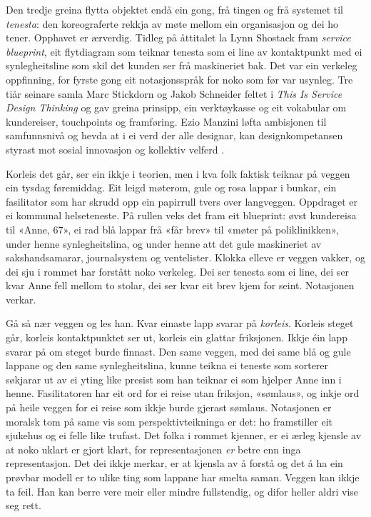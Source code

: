 Den tredje greina flytta objektet endå ein gong, frå tingen og frå systemet til \emph{tenesta}: den koreograferte rekkja av møte mellom ein organisasjon og dei ho tener. Opphavet er ærverdig. Tidleg på åttitalet la Lynn Shostack fram \emph{service blueprint}, eit flytdiagram som teiknar tenesta som ei line av kontaktpunkt med ei synlegheitsline som skil det kunden ser frå maskineriet bak. Det var ein verkeleg oppfinning, for fyrste gong eit notasjonsspråk for noko som før var usynleg. Tre tiår seinare samla Marc Stickdorn og Jakob Schneider feltet i \emph{This Is Service Design Thinking} og gav greina prinsipp, ein verktøykasse og eit vokabular om kundereiser, touchpoints og framføring. Ezio Manzini løfta ambisjonen til samfunnsnivå og hevda at i ei verd der alle designar, kan designkompetansen styrast mot sosial innovasjon og kollektiv velferd \autocite{manzini2015}.

Korleis det går, ser ein ikkje i teorien, men i kva folk faktisk teiknar på veggen ein tysdag føremiddag. Eit leigd møterom, gule og rosa lappar i bunkar, ein fasilitator som har skrudd opp ein papirrull tvers over langveggen. Oppdraget er ei kommunal helseteneste. På rullen veks det fram eit blueprint: øvst kundereisa til «Anne, 67», ei rad blå lappar frå «får brev» til «møter på poliklinikken», under henne synlegheitslina, og under henne att det gule maskineriet av sakshandsamarar, journalsystem og ventelister. Klokka elleve er veggen vakker, og dei sju i rommet har forstått noko verkeleg. Dei ser tenesta som ei line, dei ser kvar Anne fell mellom to stolar, dei ser kvar eit brev kjem for seint. Notasjonen verkar.

Gå så nær veggen og les han. Kvar einaste lapp svarar på \emph{korleis}. Korleis steget går, korleis kontaktpunktet ser ut, korleis ein glattar friksjonen. Ikkje éin lapp svarar på om steget burde finnast. Den same veggen, med dei same blå og gule lappane og den same synlegheitslina, kunne teikna ei teneste som sorterer søkjarar ut av ei yting like presist som han teiknar ei som hjelper Anne inn i henne. Fasilitatoren har eit ord for ei reise utan friksjon, «sømlaus», og inkje ord på heile veggen for ei reise som ikkje burde gjerast sømlaus. Notasjonen er moralsk tom på same vis som perspektivteikninga er det: ho framstiller eit sjukehus og ei felle like trufast. Det folka i rommet kjenner, er ei ærleg kjensle av at noko uklart er gjort klart, for representasjonen \emph{er} betre enn inga representasjon. Det dei ikkje merkar, er at kjensla av å forstå og det å ha ein prøvbar modell er to ulike ting som lappane har smelta saman. Veggen kan ikkje ta feil. Han kan berre vere meir eller mindre fullstendig, og difor heller aldri vise seg rett.

